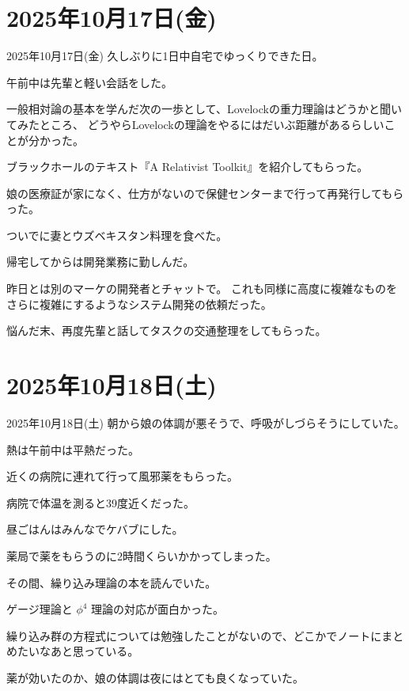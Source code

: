 \documentclass[dvipdfmx, autodetect-engine, aspectratio=169, 10.5pt]{beamer}
\begin{document}
\section{2025年10月17日(金)}

\begin{frame}{2025年10月17日(金)}
久しぶりに1日中自宅でゆっくりできた日。

午前中は先輩と軽い会話をした。

一般相対論の基本を学んだ次の一歩として、Lovelockの重力理論はどうかと聞いてみたところ、
どうやらLovelockの理論をやるにはだいぶ距離があるらしいことが分かった。

ブラックホールのテキスト『A Relativist Toolkit』を紹介してもらった。

娘の医療証が家になく、仕方がないので保健センターまで行って再発行してもらった。

ついでに妻とウズベキスタン料理を食べた。

帰宅してからは開発業務に勤しんだ。

昨日とは別のマーケの開発者とチャットで。
これも同様に高度に複雑なものをさらに複雑にするようなシステム開発の依頼だった。

悩んだ末、再度先輩と話してタスクの交通整理をしてもらった。
\end{frame}

\section{2025年10月18日(土)}

\begin{frame}{2025年10月18日(土)}
朝から娘の体調が悪そうで、呼吸がしづらそうにしていた。

熱は午前中は平熱だった。

近くの病院に連れて行って風邪薬をもらった。

病院で体温を測ると39度近くだった。

昼ごはんはみんなでケバブにした。

薬局で薬をもらうのに2時間くらいかかってしまった。

その間、繰り込み理論の本を読んでいた。

ゲージ理論と $\phi^{4}$ 理論の対応が面白かった。

繰り込み群の方程式については勉強したことがないので、どこかでノートにまとめたいなあと思っている。

薬が効いたのか、娘の体調は夜にはとても良くなっていた。
\end{frame}
\end{document}
